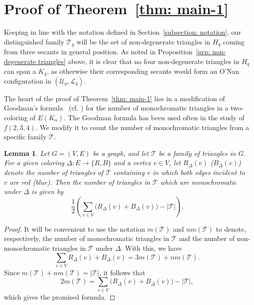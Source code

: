 \documentclass[A4paper,reqno,oneside,12pt]{amsart}
\theoremstyle{plain}
\newtheorem{lemma}[theorem]{Lemma}
\theoremstyle{definition}
\newcommand{\scL}{\mathscr{L}}
\newcommand{\scT}{\mathscr{T}}
\newcommand{\scU}{\mathscr{U}}
\begin{document}

\section{Proof of Theorem~\ref{thm: main-1}}
\label{section: proof of Thm 1}

Keeping in line with the notation defined in Section~\ref{subsection: notation}, our distinguished family $\scT_q$ will be the set of non-degenerate triangles in $H_q$ coming from three secants in general position.
As noted in Proposition~\ref{prp: non-degenerate triangles} above, it is clear that no four non-degenerate triangles in $H_q$ can span a $K_4$, as otherwise their corresponding secants would form an O'Nan configuration in $(\scU_q, \scL_q)$.

The heart of the proof of Theorem~\ref{thm: main-1} lies in a modification of Goodman's formula~\cite{G59} 
(cf. \cite[Lemma 2]{Con})
for the number of monochromatic triangles in a two-coloring of $E(K_n)$.
The Goodman formula has been used often 
\cite{DR08-1, DR08-2, FR86, LRX14, S88}
in the study of $f(2,3,4)$.
We modify it to count the number of monochromatic triangles from a specific family $\scT$.

\begin{lemma}
\label{lem: goodman}
    Let $G = (V,E)$ be a graph, and let $\scT$ be a family of triangles in $G$.
    For a given coloring $\Delta: E \to \{R,B\}$ and a vertex $v \in V$, let $R_\Delta(v)$ ($B_\Delta(v)$) denote the number of triangles of $\scT$ containing $v$ in which both edges incident to $v$ are red (blue).
    Then the number of triangles in $\scT$ which are monochromatic under $\Delta$ is given by
    \begin{equation}
    \label{eq: Goodman-general}
        \frac{1}{2} \left( \sum_{v \in V} {\Big (} R_\Delta(v) + B_\Delta(v) {\Big )} - |\scT| \right).
    \end{equation}
\end{lemma}

\begin{proof}
    It will be convenient to use the notation $m(\scT)$ and $nm(\scT)$ to denote, respectively, the number of monochromatic triangles in $\scT$ and the number of non-monochromatic triangles in $\scT$ under $\Delta$.
    With this, we have
    \begin{equation*}
        \sum_{v \in V} R_\Delta(v) + B_\Delta(v)
        = 3m(\scT) + nm(\scT).
    \end{equation*}
    Since $m(\scT) + nm(\scT) = |\scT|$, it follows that
    \begin{equation*}
        2 m(\scT)
        = \sum_{v \in V} {\Big (}R_\Delta(v) + B_\Delta(v) {\Big )} - |\scT|,
    \end{equation*}
    which gives the promised formula.
\end{proof}
\end{document}
